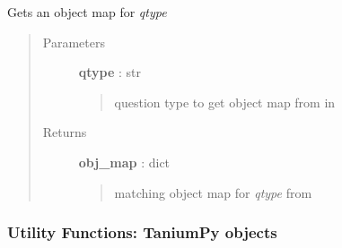 \documentclass[letterpaper,10pt,english]{sphinxmanual}
\begin{document}

\begin{fulllineitems}
\label{pytan.utils:pytan.utils.get_q_obj_map}
Gets an object map for \emph{qtype}
\begin{quote}\begin{description}
\item[{Parameters}] \leavevmode
\textbf{qtype} : str
\begin{quote}

question type to get object map from in {\hyperref[pytan.constants:pytan.constants.Q_OBJ_MAP]{}}
\end{quote}

\item[{Returns}] \leavevmode
\textbf{obj\_map} : dict
\begin{quote}

matching object map for \emph{qtype} from {\hyperref[pytan.constants:pytan.constants.Q_OBJ_MAP]{}}
\end{quote}

\end{description}\end{quote}

\end{fulllineitems}



\subsubsection{Utility Functions: TaniumPy objects}
\label{pytan.utils:utility-functions-taniumpy-objects}
\end{document}

